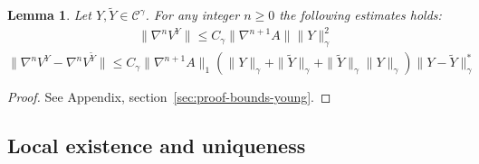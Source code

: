 \documentclass[a4paper,12pt,reqno]{amsart}
\newcommand{\wt}{\widetilde}
\newcommand{\norm}[1]{\|#1\|}
\newtheorem{lemma}{Lemma}
\newcommand{\CC}{\mathscr{C}}
\begin{document}
\begin{lemma}
\label{lemma:boundsyoung}
Let $Y,\wt Y \in \CC^\gamma$.
For any integer $n \ge 0$  the following estimates holds:
\begin{equation}
\label{eq:boundv}
  \begin{split}
\|\nabla^n V^{Y}\| \le C_\gamma \norm{\nabla^{n+1} A} \norm{Y}_{\gamma}^2
  \end{split}
\end{equation}
\begin{equation}
  \label{eq:boundvdiff}
\|\nabla^n V^{Y}- \nabla^n V^{\wt Y}\| \le
C_\gamma
\norm{\nabla^{n+1} A}_{1}(\norm{Y}_{\gamma}+\norm{\wt Y}_{\gamma}+\norm{\wt
  Y}_{\gamma} \norm{ Y}_{\gamma})  \norm{Y-\wt Y}_{\gamma}^*
\end{equation}
\end{lemma}
\begin{proof} See Appendix, section~\ref{sec:proof-bounds-young}.
\end{proof}

\subsection{Local existence and uniqueness}
\end{document}
